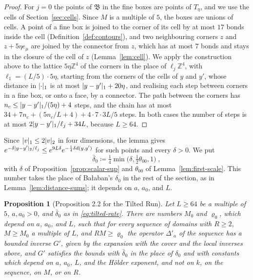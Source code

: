 \documentclass[11pt]{preprint}
\DeclarePairedDelimiter{\abs}{\lvert}{\rvert}
\numberwithin{equation}{section}
\newtheorem{proposition}[theorem]{Proposition}
\theoremstyle{definition}
\theoremstyle{remark}
\theoremstyle{plain}
\begin{document}
\begin{proof}
For $j = 0$ the points of $\mathfrak B$ in the fine boxes are points of $T_\eta$, and we use the cells of Section~\ref{sec:cells}. Since $M$ is a multiple of $5$, the boxes are unions of cells. A point of a fine box is joined to the corner of its cell by at most $17$ bonds inside the cell (Definition~\ref{def:contours}), and two neighbouring corners $z$ and $z + 5\eta e_\mu$ are joined by the connector from $z$, which has at most $7$ bonds and stays in the closure of the cell of $z$ (Lemma~\ref{lem:cell}). We apply the construction above to the lattice $5\eta\mathbb Z^4$ of the corners in the place of $\ell_j\mathbb Z^4$, with $\ell_1 = (L/5) \cdot 5\eta$, starting from the corners of the cells of $y$ and $y'$, whose distance in $\abs\cdot_1$ is at most $\abs{y - y'}_1 + 20\eta$, and realising each step between corners in a fine box, or onto a face, by a connector. The path between the corners has $n_c \leq \abs{y - y'}_1/(5\eta) + 4$ steps, and the chain has at most $34 + 7n_c + (5n_c/L + 4) + 4 \cdot 7 \cdot 3L/5$ steps. In both cases the number of steps is at most $2\abs{y - y'}_1/\ell_j + 34L$, because $L \geq 64$.
\end{proof}

Since $\abs v_1 \leq 2\abs v_2$ in four dimensions, the lemma gives $e^{-\delta\abs{y - y'}_2/\ell_j} \leq e^{9L\delta}e^{-\frac14\delta d(y, y')}$ for such points and every $\delta > 0$. We put
\begin{equation}\label{eq:tilted-rate}
    \bar\delta_0 \coloneqq \tfrac14\min\bigl(\delta, \tfrac12\theta_{00}, 1\bigr)\;,
\end{equation}
with $\delta$ of Proposition~\ref{prop:scalar-sup} and $\theta_{00}$ of Lemma~\ref{lem:first-scale}. This number takes the place of Ba{\l}aban's $\delta_0$ in the rest of the section, as in Lemma~\ref{lem:distance-sums}; it depends on $a$, $a_0$, and $L$.

\begin{proposition}[Proposition 2.2 for the Tilted Run]\label{prop:sequence-scalar}
Let $L \geq 64$ be a multiple of $5$, $a, a_0 > 0$, and $\bar\delta_0$ as in \eqref{eq:tilted-rate}. There are numbers $M_0$ and $\varrho_0$, which depend on $a$, $a_0$, and $L$, such that for every sequence of domains with $R \geq 2$, $M \geq M_0$ a multiple of $L$, and $RM \geq \varrho_0$ the operator $\Delta'_a$ of the sequence has a bounded inverse $G'$, given by the expansion \cite[(2.50)]{BalabanPRT2} with the cover and the local inverses above, and $G'$ satisfies the bounds \cite[(2.67), p.~234]{BalabanPRT2} with $\bar\delta_0$ in the place of $\delta_0$ and with constants which depend on $a$, $a_0$, $L$, and the H\"older exponent, and not on $k$, on the sequence, on $M$, or on $R$.
\end{proposition}
\end{document}
